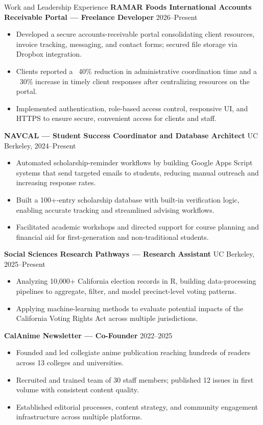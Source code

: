 \documentclass{resume}
\begin{document}
\begin{rSection}{Work and Leadership Experience}
\textbf{RAMAR Foods International Accounts Receivable Portal — Freelance Developer} \hfill 2026–Present
\begin{itemize}
  \item Developed a secure accounts-receivable portal consolidating client resources, invoice tracking, messaging, and contact forms; secured file storage via Dropbox integration.
  \item Clients reported a ~40\% reduction in administrative coordination time and a ~30\% increase in timely client responses after centralizing resources on the portal.
  \item Implemented authentication, role-based access control, responsive UI, and HTTPS to ensure secure, convenient access for clients and staff.
\end{itemize}

\textbf{NAVCAL — Student Success Coordinator and Database Architect} \hfill UC Berkeley, 2024–Present
\begin{itemize}
  \item Automated scholarship-reminder workflows by building Google Apps Script systems that send targeted emails to students, reducing manual outreach and increasing response rates.
  \item Built a 100+-entry scholarship database with built-in verification logic, enabling accurate tracking and streamlined advising workflows.
  \item Facilitated academic workshops and directed support for course planning and financial aid for first-generation and non-traditional students.
\end{itemize}

\textbf{Social Sciences Research Pathways — Research Assistant} \hfill UC Berkeley, 2025–Present
\begin{itemize}
  \item Analyzing 10,000+ California election records in R, building data-processing pipelines to aggregate, filter, and model precinct-level voting patterns.
  \item Applying machine-learning methods to evaluate potential impacts of the California Voting Rights Act across multiple jurisdictions.
\end{itemize}

\textbf{CalAnime Newsletter — Co-Founder} \hfill 2022–2025
\begin{itemize}
  \item Founded and led collegiate anime publication reaching hundreds of readers across 13 colleges and universities.
  \item Recruited and trained team of 30 staff members; published 12 issues in first volume with consistent content quality.
  \item Established editorial processes, content strategy, and community engagement infrastructure across multiple platforms.
\end{itemize}


\end{rSection}
\end{document}
